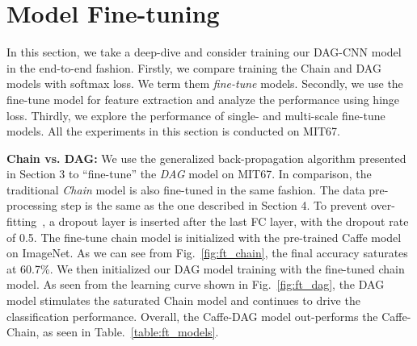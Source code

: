 \documentclass[10pt,twocolumn,letterpaper]{article}
\begin{document}
\section{Model Fine-tuning}

In this section, we take a deep-dive and consider training our DAG-CNN model in the end-to-end fashion. Firstly, we compare training the Chain and DAG models with softmax loss. We term them \textit{fine-tune} models. Secondly, we use the fine-tune model for feature extraction and analyze the performance using hinge loss. Thirdly, we explore the performance of single- and multi-scale fine-tune models. All the experiments in this section is conducted on MIT67. 


{\bf Chain vs. DAG: } We use the generalized back-propagation algorithm presented in Section 3 to ``fine-tune'' the \textit{DAG} model on MIT67. In comparison, the traditional \textit{Chain} model is also fine-tuned in the same fashion. The data pre-processing step is the same as the one described in Section 4. To prevent over-fitting~\cite{AlexNet}, a dropout layer is inserted after the last FC layer, with the dropout rate of 0.5. The fine-tune chain model is initialized with the pre-trained Caffe model on ImageNet. As we can see from Fig.~\ref{fig:ft_chain}, the final accuracy saturates at 60.7\%. We then initialized our DAG model training with the fine-tuned chain model. As seen from the learning curve shown in Fig.~\ref{fig:ft_dag}, the DAG model stimulates the saturated Chain model and continues to drive the classification performance. Overall, the Caffe-DAG model out-performs the Caffe-Chain, as seen in Table.~\ref{table:ft_models}.
\end{document}
